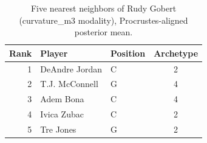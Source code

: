 \begin{table}[htbp]
  \centering\small
  \begin{tabular}{rllc}
    \toprule
    Rank & Player & Position & Archetype \\
    \midrule
    1 & DeAndre Jordan & C & 2 \\
    2 & T.J. McConnell & G & 4 \\
    3 & Adem Bona & C & 4 \\
    4 & Ivica Zubac & C & 2 \\
    5 & Tre Jones & G & 2 \\
    \bottomrule
  \end{tabular}
  \caption{Five nearest neighbors of Rudy Gobert (curvature_m3 modality), Procrustes-aligned posterior mean.}
  \label{tab:Rudy_Gobert_neighbors_curvature_m3}
\end{table}

